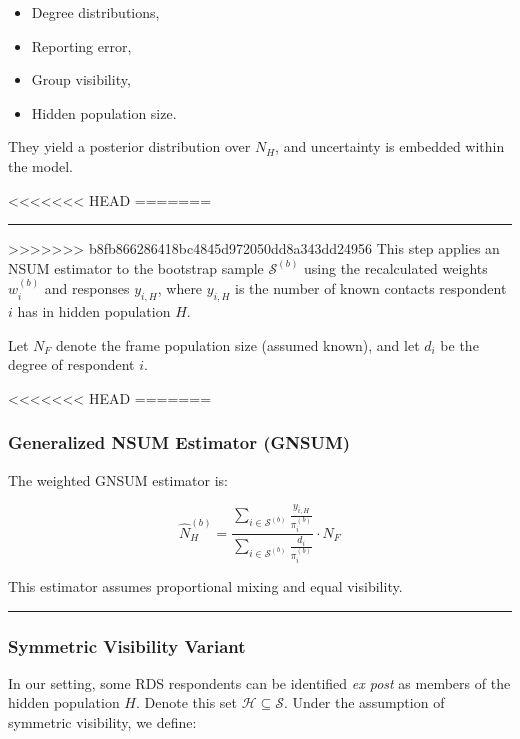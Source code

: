\documentclass[
  12pt,
  letterpaper,
  DIV=11,
  numbers=noendperiod]{scrartcl}
\theoremstyle{plain}
\theoremstyle{definition}
\begin{document}
{\begin{itemize}
\item
  Degree distributions,
\item
  Reporting error,
\item
  Group visibility,
\item
  Hidden population size.
\end{itemize}

They yield a posterior distribution over \(N_H\), and uncertainty is
embedded within the model.

<<<<<<< HEAD
=======
\begin{center}\rule{0.5\linewidth}{0.5pt}\end{center}

>>>>>>> b8fb866286418bc4845d972050dd8a343dd24956
This step applies an NSUM estimator to the bootstrap sample
\(\mathcal{S}^{(b)}\) using the recalculated weights \(w_i^{(b)}\) and
responses \(y_{i,H}\), where \(y_{i,H}\) is the number of known contacts
respondent \(i\) has in hidden population \(H\).

Let \(N_F\) denote the frame population size (assumed known), and let
\(d_i\) be the degree of respondent \(i\).

<<<<<<< HEAD
=======
\subsubsection{Generalized NSUM Estimator
(GNSUM)}\label{generalized-nsum-estimator-gnsum}

The weighted GNSUM estimator is:

\[
\hat{N}_H^{(b)} = \frac{\sum_{i \in \mathcal{S}^{(b)}} \frac{y_{i,H}}{\pi_i^{(b)}}}{\sum_{i \in \mathcal{S}^{(b)}} \frac{d_i}{\pi_i^{(b)}}} \cdot N_F
\]

This estimator assumes proportional mixing and equal visibility.

\begin{center}\rule{0.5\linewidth}{0.5pt}\end{center}

\subsubsection{Symmetric Visibility
Variant}\label{symmetric-visibility-variant}

In our setting, some RDS respondents can be identified \emph{ex post} as
members of the hidden population \(H\). Denote this set
\(\mathcal{H} \subseteq \mathcal{S}\). Under the assumption of symmetric
visibility, we define:

}
\end{document}
